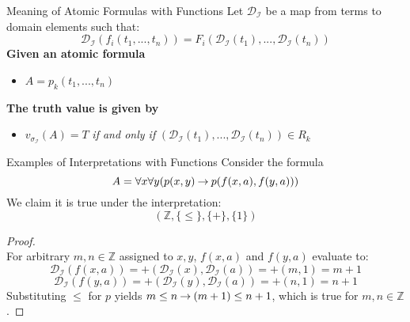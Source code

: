 \documentclass[style=sailor,size=12pt,mode=present]{powerdot}
\theoremstyle{definition}
\newenvironment{ex}[1]
  {\renewcommand\theinnerexample{#1}\innerexample}
  {\endinnerexample}
\newcommand{\bb}[1]{\mathbb{#1}}
\newcommand{\Z}{\bb{Z}}
\begin{document}
\begin{wideslide}[bm=,toc=]{Meaning of Atomic Formulas with Functions}
Let $\mathcal{D}_{\mathcal{I}}$ be a map from terms to domain elements such
that:
\[
 \mathcal{D}_{\mathcal{I}} (f_i(t_1,...,t_n)) = F_i(\mathcal{D}_{\mathcal{I}}(t_1),...,\mathcal{D}_{\mathcal{I}}(t_n)) 
  \]
{\bf Given an atomic formula} 
\begin{itemize}
\item $A = p_k(t_1,...,t_n)$
\end{itemize}
{\bf The truth value is given by}
\begin{itemize}
\item $v_{\sigma_{\mathcal{I}}}(A) = T$ \emph{if and only if} $(\mathcal{D}_{\mathcal{I}}(t_1),...,\mathcal{D}_{\mathcal{I}}(t_n)) \in R_k$
\end{itemize}
\end{wideslide}
\begin{wideslide}[bm=,toc=]{Examples of Interpretations with Functions}
\begin{ex}{9.4}
Consider the formula
\[
  A = \forall x \forall y(p(x,y) \mathbin{\rightarrow} p(f(x,a),f(y,a)))
\]
We claim it is true under the interpretation:
\[
  (\Z,\{\leq\}, \{+\}, \{1\}) 
\]
\vspace{-4ex}
\begin{proof}
~\\For arbitrary $m,n \in \Z$ assigned to $x,y$, $f(x,a)$ and $f(y,a)$ evaluate to:
\vspace{-1ex}
\[ \mathcal{D}_{\mathcal{I}}(f(x,a)) = +(\mathcal{D}_{\mathcal{I}}(x), \mathcal{D}_{\mathcal{I}}(a)) = +(m,1) = m+1 \]
\vspace{-4ex}
\[ \mathcal{D}_{\mathcal{I}}(f(y,a)) = +(\mathcal{D}_{\mathcal{I}}(y), \mathcal{D}_{\mathcal{I}}(a)) = +(n,1) = n+1 \]
Substituting $\leq$ for $p$ yields $m \leq n \mathbin{\rightarrow} (m+1) \leq n + 1$, which is
true for $m,n \in \Z$.
\end{proof}
\end{ex}
\end{wideslide}
\end{document}
